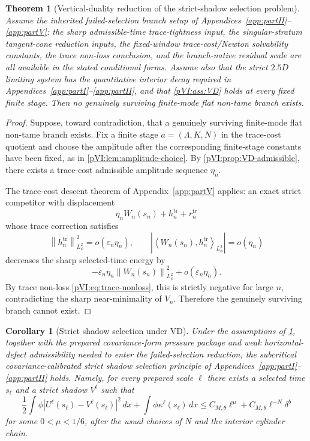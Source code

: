 \documentclass[11pt]{article}
\numberwithin{equation}{section}
\theoremstyle{plain}
\newtheorem{theorem}{Theorem}[section]
\newtheorem{corollary}{Corollary}[section]
\theoremstyle{definition}
\theoremstyle{remark}
\newcommand{\eps}{\varepsilon}
\newcommand{\tr}{\operatorname{tr}}
\newcommand{\abs}[1]{\left|#1\right|}
\newcommand{\norm}[2]{\left\|#1\right\|_{#2}}
\newcommand{\inner}[2]{\left\langle #1,#2\right\rangle}
\begin{document}
\begin{theorem}[Vertical-duality reduction of the strict-shadow selection problem]\label{pVI:thm:VD-closure}
Assume the inherited failed-selection branch setup of Appendices~\ref{app:partII}--\ref{app:partV}: the sharp admissible-time trace-tightness input, the singular-stratum tangent-cone reduction inputs, the fixed-window trace-cost/Newton solvability constants, the trace non-loss conclusion, and the branch-native residual scale are all available in the stated conditional forms.  Assume also that the strict \(2.5D\) limiting system has the quantitative interior decay required in Appendices~\ref{app:partI}--\ref{app:partII}, and that \cref{pVI:ass:VD} holds at every fixed finite stage.  Then no genuinely
surviving finite-mode flat non-tame branch exists.
\end{theorem}

\begin{proof}
Suppose, toward contradiction, that a genuinely surviving finite-mode flat non-tame branch exists.
Fix a finite stage \(a=(\Lambda,K,N)\) in the trace-cost quotient and choose the amplitude after the corresponding finite-stage constants have been fixed, as in \cref{pVI:lem:amplitude-choice}.
By \cref{pVI:prop:VD-admissible}, there exists a trace-cost admissible amplitude sequence
\(\eta_n\).

The trace-cost descent theorem of Appendix~\ref{app:partV} applies: an exact strict competitor with displacement
\[
        \eta_nW_n(s_n)+h_n^{\tr}+r_n^{\tr}
\]
whose trace correction satisfies
\[
        \norm{h_n^{\tr}}{L^2_\phi}^2=o(\eps_n\eta_n),
        \qquad
        \abs{\inner{W_n(s_n)}{h_n^{\tr}}_{L^2_\phi}}=o(\eta_n)
\]
decreases the sharp selected-time energy by
\[
        -\eps_n\eta_n\norm{W_n(s_n)}{L^2_\phi}^2+o(\eps_n\eta_n).
\]
By trace non-loss \eqref{pVI:eq:trace-nonloss}, this is strictly negative for large \(n\), contradicting
the sharp near-minimality of \(V_n\).  Therefore the genuinely surviving branch cannot exist.
\end{proof}

\begin{corollary}[Strict shadow selection under VD]\label{pVI:cor:strict-selection-VD}
Under the assumptions of \cref{pVI:thm:VD-closure}, together with the prepared covariance-form pressure package and weak horizontal-defect admissibility needed to enter the failed-selection reduction, the subcritical covariance-calibrated strict shadow
selection principle of Appendices~\ref{app:partI}--\ref{app:partII} holds.  Namely, for every prepared scale \(\ell\) there exists a
selected time \(s_\ell\) and a strict shadow \(V^\ell\) such that
\[
        \frac12\int \phi|U^\ell(s_\ell)-V^\ell(s_\ell)|^2\,dx
        +
        \int\phi\kappa^\ell(s_\ell)\,dx
        \le
        C_{M,\theta}\ell^\mu
        +
        C_{M,\theta}\ell^{-N}\delta^b
\]
for some \(0<\mu<1/6\), after the usual choices of \(N\) and the interior cylinder chain.
\end{corollary}
\end{document}
